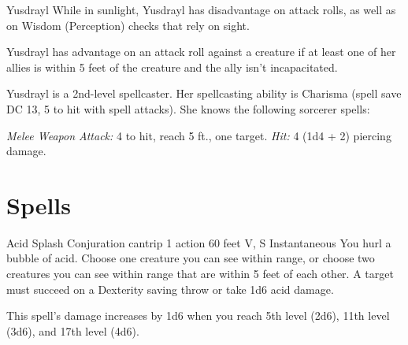 \documentclass[10pt,a4paper,twoside,bg=print,twocolumn,openany,nodeprecatedcode]{dndbook}
\begin{document}
\begin{DndMonster}[float=t]{Yusdrayl}
\DndMonsterBasics[
armor-class = {12 (15 with \textit{mage armor})},
hit-points = {\DndDice{3d6 + 6}},
speed = {30 ft.}
]
\DndMonsterAbilityScores[
 str = 8,
 dex = 15,
 con = 14,
 int = 10,
 wis = 10,
 cha = 16
]
\DndMonsterDetails[
skills = {Arcana +2, Insight +2, Stealth +4},
senses = {darkvision 60 ft., passive perception 10},
languages = {Common, Draconic},
challenge = 1,
]
While in sunlight, Yusdrayl has disadvantage on attack rolls, as well as on Wisdom (Perception) checks that rely on sight.

Yusdrayl has advantage on an attack roll against a creature if at least one of her allies is within 5 feet of the creature and the ally isn't incapacitated.

Yusdrayl is a 2nd-level spellcaster. Her spellcasting ability is Charisma (spell save DC 13, 5 to hit with spell attacks). She knows the following sorcerer spells:
\begin{DndMonsterSpells}
\end{DndMonsterSpells}
\textsl{Melee Weapon Attack:} 4 to hit, reach 5 ft., one target. \textsl{Hit:} 4 (1d4 + 2) piercing damage.

\end{DndMonster}


\chapter{Spells}


\DndSpellHeader%
{Acid Splash}
{Conjuration cantrip}
{1 action}
{60 feet}
{V, S}
{Instantaneous}
You hurl a bubble of acid. Choose one creature you can see within range, or choose two creatures you can see within range that are within 5 feet of each other. A target must succeed on a Dexterity saving throw or take 1d6 acid damage.

This spell's damage increases by 1d6 when you reach 5th level (2d6), 11th level (3d6), and 17th level (4d6).

\end{document}
